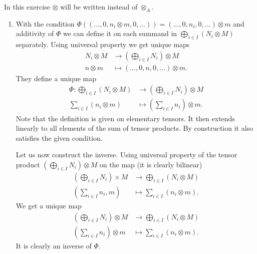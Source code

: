 \begin{exercise}{3}
    In this exercise $\otimes$ will be written instead of $\otimes_A$.
    \begin{enumerate}
        \item With the condition $\Phi((\ldots, 0, n_i \otimes m, 0, \ldots)) =
            (\ldots, 0, n_i, 0, \ldots) \otimes m$ and additivity of $\Phi$ we
            can define it on each summand in $\bigoplus_{i \in I} (N_i \otimes
            M)$ separately. Using universal property we get unique maps
            \begin{align*}
                N_i \otimes M &\rightarrow (\bigoplus_{i \in I} N_i) \otimes M
                \\
                n \otimes m &\mapsto (\ldots, 0, n, 0, \ldots) \otimes m.
            \end{align*}
            They define a unique map
            \begin{align*}
                \Phi \colon \bigoplus_{i \in I} (N_i \otimes M) &\rightarrow
                (\bigoplus_{i \in I} N_i) \otimes M \\
                \sum_{i \in I} (n_i \otimes m) &\mapsto (\sum_{i \in I} n_i)
                \otimes m.
            \end{align*}
            Note that the definition is given on elementary tensors. It then
            extends linearly to all elements of the sum of tensor products. By
            construction it also satisfies the given condition.

            Let us now construct the inverse. Using universal property of the
            tensor product $(\bigoplus_{i \in I} N_i) \otimes M$ on the map
            (it is clearly bilinear)
            \begin{align*}
                (\bigoplus_{i \in I} N_i) \times M &\rightarrow \bigoplus_{i \in
                I} (N_i \otimes M) \\
                (\sum_{i \in I} n_i, m) &\mapsto \sum_{i \in I} (n_i \otimes m).
            \end{align*}
            We get a unique map
            \begin{align*}
                (\bigoplus_{i \in I} N_i) \otimes M &\rightarrow \bigoplus_{i
                \in I} (N_i \otimes M) \\
                (\sum_{i \in I} n_i) \otimes m &\mapsto \sum_{i \in I} (n_i
                \otimes m).
            \end{align*}
            It is clearly an inverse of $\Phi$.
    \end{enumerate}
\end{exercise}


